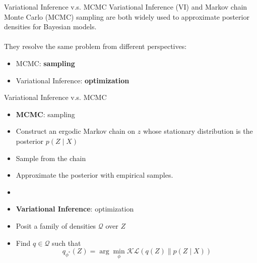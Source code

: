 \documentclass{beamer}
\begin{document}
\begin{frame}{Variational Inference v.s. MCMC}
Variational Inference (VI) and Markov chain Monte Carlo (MCMC) sampling are both widely used to approximate posterior densities for Bayesian models.\\
~\\
They resolve the same problem from different perspectives:
\begin{itemize}
    \item MCMC: {\bf sampling}
    \item Variational Inference: {\bf optimization}
\end{itemize}
\end{frame}
\begin{frame}{Variational Inference v.s. MCMC}

\begin{itemize}
    \item[] {\bf MCMC}: sampling
    \item Construct an ergodic Markov chain on $z$ whose stationary distribution is the posterior $p(Z\mid X)$
    \item Sample from the chain %
    \item Approximate the posterior with empirical samples.%
    \item[]
    \item[] {\bf Variational Inference}: optimization
    \item Posit a family of densities $\mathcal{Q}$ over $Z$
    \item Find $q\in\mathcal{Q}$ such that $$q_{\phi^\ast}(Z)=\arg\min_{\phi}\mathcal{KL}(q(Z)\parallel p(Z\mid X))$$
\end{itemize}
\end{frame}
\end{document}
